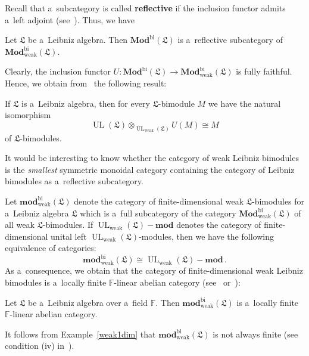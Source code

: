 \documentclass{jonasart}
\DeclareMathOperator{\bi}{bi}
\DeclareMathOperator{\UL}{UL}
\DeclareMathOperator{\weak}{weak}
\newcommand{\fbb}{\mathbb{F}}
\newcommand{\fdmod}{\mathbf{mod}}
\newcommand{\lf}{\mathfrak{L}}
\newcommand{\Mod}{\mathbf{Mod}}
\begin{document}
	Recall that a~subcategory is called \textbf{reflective} if the inclusion functor admits a~left adjoint (see~\cite[p.\ 91]{McL}). Thus, we have
	\begin{proposition}\label{reflectiv}
		Let $\lf$ be a~Leibniz algebra. Then $\Mod^{\bi}(\lf)$ is a~reflective subcategory of $\Mod_{\weak}^{\bi}(\lf)$.
	\end{proposition}
	Clearly, the inclusion functor $U:\Mod^{\bi}(\lf)\to\Mod_{\weak}^{\bi}(\lf)$
	is fully faithful. Hence, we obtain from~\cite[Theorem 1, p.\ 90]{McL}
	the following result:
	\begin{proposition}
		If $\lf$ is a~Leibniz algebra, then for every $\lf$-bimodule $M$ we have the natural isomorphism
		\[
			\UL(\lf)\otimes_{\UL_{\weak}(\lf)}U(M)\cong M
		\]
		of $\lf$-bimodules.
	\end{proposition}
	It would be interesting to know whether the category of weak Leibniz bimodules is the \textit{smallest} symmetric monoidal category containing the category of Leibniz bimodules as a~reflective subcategory.

	Let $\fdmod_{\weak}^{\bi}(\lf)$ denote the category of finite-dimensional weak $\lf$-bimodules for a~Leibniz algebra $\lf$ which is a~full subcategory of the category $\Mod_{\weak}^{\bi}(\lf)$ of all weak
	$\lf$-bimodules. If $\UL_{\weak}(\lf)-\fdmod$ denotes the category of finite-dimensional unital left $\UL_{\weak}(\lf)$-modules, then we have the following equivalence of categories:
	\[
		\fdmod_{\weak}^{\bi}(\lf)\cong\UL_{\weak}(\lf)-\fdmod\,.
	\]
	As a~consequence, we obtain that the category of finite-dimensional weak Leibniz bimodules is a~locally finite $\fbb$-linear abelian category (see~\cite[Chapter VIII]{McL} or~\cite[Definitions~1.8.1, 1.2.2, and 1.3.1, respectively]{EGNO}):

	\begin{proposition}\label{locfinab}
		Let $\lf$ be a~Leibniz algebra over a~field $\fbb$. Then
		$\fdmod_{\weak}^{\bi}(\lf)$ is a~locally finite $\fbb$-linear abelian category.
	\end{proposition}

	\begin{remark}
		It follows from Example~\ref{weak1dim} that $\fdmod_{\weak}^{\bi} (\lf)$ is not always finite (see condition (iv) in~\cite[Definition 1.8.6]{EGNO}).
	\end{remark}
\end{document}
